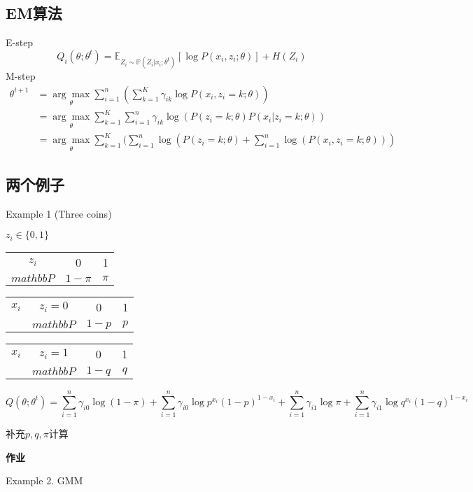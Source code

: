 \documentclass[UTF8]{ctexart}
\begin{document}
\subsection{EM算法}
E-step
\begin{equation*}
    Q_i(\theta; \theta^t) = \mathbb{E}_{Z_i \sim \mathbb{P}(Z_i | x_i; \theta^t)}[\log P(x_i, z_i; \theta)] + H(Z_i)
\end{equation*}
M-step
\begin{equation*}
    \begin{aligned}
        \theta^{t+1} &= \underset{\theta}{\arg\max}  \sum_{i=1}^n(\sum_{k=1}^K \gamma_{ik} \log P(x_i, z_i=k;\theta)) \\    
                     &= \underset{\theta}{\arg\max}  \sum_{k=1}^K\sum_{i=1}^n \gamma_{ik} \log (P(z_i=k;\theta)P(x_i|z_i=k;\theta)) \\    
                     &= \underset{\theta}{\arg\max}  \sum_{k=1}^K (\sum_{i=1}^n\log (P(z_i=k;\theta)+\sum_{i=1}^n\log (P(x_i, z_i=k;\theta) ))
    \end{aligned}
\end{equation*}

\subsection{两个例子}

Example 1 (Three coins)

$z_i\in\{0,1\}$ 
\begin{table*}
    \begin{tabular}{c | c c}
        $z_i$ & 0 & 1 \\
        $mathbb{P}$ & $1-\pi$ & $\pi$ \\
    \end{tabular}
\end{table*}

\begin{table*}
    \begin{tabular}{c | c | c c}
        $x_i$ & $z_i=0$ & 0 & 1 \\
        & $mathbb{P}$ & $1-p$ & $p$ \\
    \end{tabular}
\end{table*}

\begin{table*}
    \begin{tabular}{c | c | c c}
        $x_i$ & $z_i=1$ & 0 & 1 \\
        & $mathbb{P}$ & $1-q$ & $q$ \\
    \end{tabular}
\end{table*}

\begin{equation*}
    Q(\theta; \theta^t) = \sum_{i=1}^n \gamma_{i0} \log (1-\pi) + \sum_{i=1}^n \gamma_{i0} \log p^{x_i} (1-p)^{1-x_i}
    + \sum_{i=1}^n \gamma_{i1} \log \pi + \sum_{i=1}^n \gamma_{i1} \log q^{x_i} (1-q)^{1-x_i}
\end{equation*}

补充$p, q, \pi$计算

\textbf{作业}

Example 2. GMM
\end{document}
